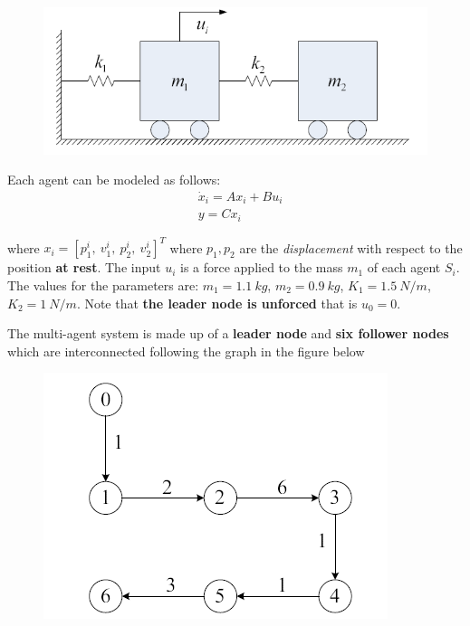\begin{figure}[h]
    \centering
    \includegraphics[scale=0.7]{images/excoop.png}
\end{figure}
\noindent
Each agent can be modeled as follows: 
\begin{equation*}
    \begin{aligned}
        &\dot{x}_i = A x_i + B u_i\\
        &y = Cx_i
    \end{aligned}
\end{equation*}

where $x_i = [p_1^i, \ v_1^i, \  p_2^i, \ v_2^i]^T$ where $p_1, p_2$ are the \textit{displacement} with respect to the position \textbf{at rest}. The input $u_i$ is a force applied to the mass $m_1$ of each agent $S_i$. The values for the parameters are: $m_1 = 1.1 \ kg$, $m_2 = 0.9 \ kg$, $K_1 = 1.5 \ N/m$, $K_2 = 1 \ N/m$. Note that \textbf{the leader node is unforced} that is $u_0=0$.

The multi-agent system is made up of a \textbf{leader node} and \textbf{six follower nodes} which are interconnected following the graph in the figure below

\begin{figure}[h]
    \centering
    \includegraphics[scale=1]{images/graphTop.png}
\end{figure}

